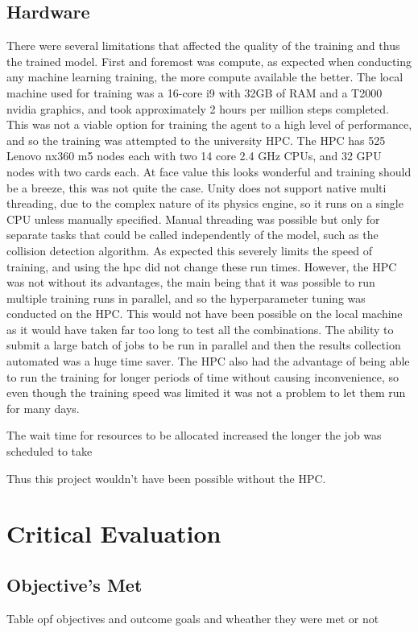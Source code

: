 \subsection{Hardware}\label{sec:hardware_evaluation}
There were several limitations that affected the quality of the training and thus the trained model. First and foremost was compute, as expected when conducting any machine learning training, the more compute available the better. The local machine used for training was a 16-core i9 with 32GB of RAM and a T2000 nvidia graphics, and took approximately 2 hours per million steps completed. This was not a viable option for training the agent to a high level of performance, and so the training was attempted to the university HPC. The HPC has 525 Lenovo nx360 m5 nodes each with two 14 core 2.4 GHz CPUs, and 32 GPU nodes with two cards each. At face value this looks wonderful and training should be a breeze, this was not quite the case. Unity does not support native multi threading, due to the complex nature of its physics engine, so it runs on a single CPU unless manually specified. Manual threading was possible but only for separate tasks that could be called independently of the model, such as the collision detection algorithm. As expected this severely limits the speed of training, and using the hpc did not change these run times.
However, the HPC was not without its advantages, the main being that it was possible to run multiple training runs in parallel, and so the hyperparameter tuning was conducted on the HPC. This would not have been possible on the local machine as it would have taken far too long to test all the combinations. The ability to submit a large batch of jobs to be run in parallel and then the results collection automated was a huge time saver. The HPC also had the advantage of being able to run the training for longer periods of time without causing inconvenience, so even though the training speed was limited it was not a problem to let them run for many days. 

The wait time for resources to be allocated increased the longer the job was scheduled to take 


Thus this project wouldn't have been possible without the HPC.



\section{Critical Evaluation}


\subsection{Objective's Met}
Table opf objectives and outcome goals and wheather they were met or not



